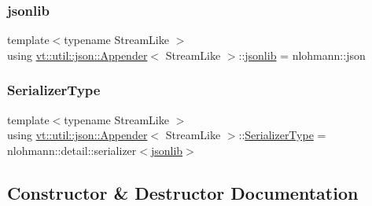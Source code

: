 \mbox{\label{structvt_1_1util_1_1json_1_1_appender_aa822e25e24db1cdea96f00b79f55f492}} 
\subsubsection{\texorpdfstring{jsonlib}{jsonlib}}
{\footnotesize\ttfamily template$<$typename Stream\+Like $>$ \\
using \hyperlink{structvt_1_1util_1_1json_1_1_appender}{vt\+::util\+::json\+::\+Appender}$<$ Stream\+Like $>$\+::\hyperlink{structvt_1_1util_1_1json_1_1_appender_aa822e25e24db1cdea96f00b79f55f492}{jsonlib} =  nlohmann\+::json}

\mbox{\label{structvt_1_1util_1_1json_1_1_appender_a26808926bcd93d8f2b7d3d6ec279cc95}} 
\subsubsection{\texorpdfstring{Serializer\+Type}{SerializerType}}
{\footnotesize\ttfamily template$<$typename Stream\+Like $>$ \\
using \hyperlink{structvt_1_1util_1_1json_1_1_appender}{vt\+::util\+::json\+::\+Appender}$<$ Stream\+Like $>$\+::\hyperlink{structvt_1_1util_1_1json_1_1_appender_a26808926bcd93d8f2b7d3d6ec279cc95}{Serializer\+Type} =  nlohmann\+::detail\+::serializer$<$\hyperlink{structvt_1_1util_1_1json_1_1_appender_aa822e25e24db1cdea96f00b79f55f492}{jsonlib}$>$}



\subsection{Constructor \& Destructor Documentation}
\mbox{\label{structvt_1_1util_1_1json_1_1_appender_a6864b59ca45f5e832b7b60821d0dd8af}} 
